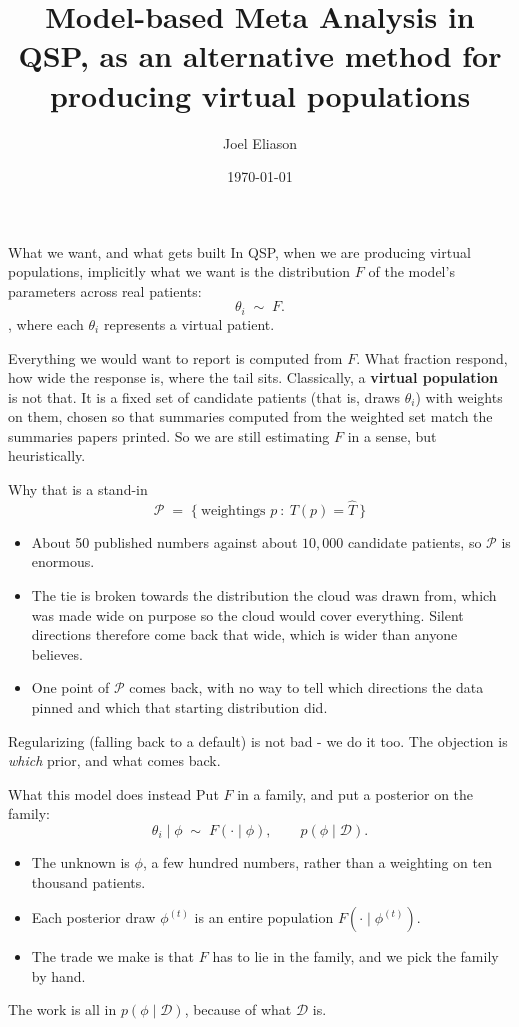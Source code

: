 \documentclass[10pt,aspectratio=169]{beamer}
\title{Model-based Meta Analysis in QSP, as an alternative method for producing virtual populations}
\author{Joel Eliason}
\date{\today}
\newcommand{\Dset}{\mathcal{D}}
\newcommand{\term}[1]{\alert{\textbf{#1}}}
\begin{document}
\maketitle

\begin{frame}[t]{What we want, and what gets built}
  In QSP, when we are producing virtual populations, implicitly what we want is the distribution $F$ of the model's parameters across real patients:
  \[ \theta_i \;\sim\; F . \], where each $\theta_i$ represents a virtual patient.

  Everything we would want to report is computed from $F$. What fraction
  respond, how wide the response is, where the tail sits.
  \vfill
  Classically, a \term{virtual population} is not that. It is a fixed set of candidate
  patients (that is, draws $\theta_i$) with weights on them, chosen so that summaries computed from the
  weighted set match the summaries papers printed. So we are still estimating $F$ in a sense, but heuristically.
\end{frame}

\begin{frame}[t]{Why that is a stand-in}
  \[
    \mathcal{P} \;=\; \big\{\ \text{weightings } p \ :\ T(p) = \widehat T\ \big\}
  \]
  \begin{itemize}\setlength\itemsep{10pt}
    \item About 50 published numbers against about $10{,}000$ candidate
      patients, so $\mathcal{P}$ is enormous.
    \item The tie is broken towards the distribution the cloud was drawn from,
      which was made wide on purpose so the cloud would cover everything. Silent
      directions therefore come back that wide, which is wider than anyone
      believes.
    \item One point of $\mathcal{P}$ comes back, with no way to tell which
      directions the data pinned and which that starting distribution did.
  \end{itemize}
  \vfill
  {\small Regularizing (falling back to a default) is not bad -  we do it too. The objection is
   \emph{which} prior, and what comes back.\par}
\end{frame}

\begin{frame}[t]{What this model does instead}
  Put $F$ in a family, and put a posterior on the family:
  \[ \theta_i \mid \phi \;\sim\; F(\cdot\mid\phi), \qquad p(\phi\mid\Dset) . \]
  \begin{itemize}\setlength\itemsep{10pt}
    \item The unknown is $\phi$, a few hundred numbers, rather than a weighting
      on ten thousand patients.
    \item Each posterior draw $\phi^{(t)}$ is an entire population
      $F(\cdot\mid\phi^{(t)})$.
    \item The trade we make is that $F$ has to lie in the family, and we pick the family
      by hand.
  \end{itemize}
  \vfill
  The work is all in $p(\phi\mid\Dset)$, because of what $\Dset$ is.
\end{frame}
\end{document}
